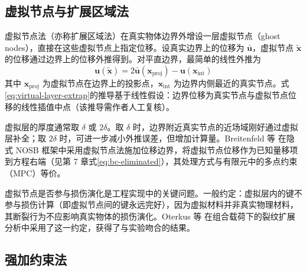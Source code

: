 \subsection{虚拟节点与扩展区域法}

虚拟节点法（亦称扩展区域法）在真实物体边界外增设一层虚拟节点（ghost nodes），直接在这些虚拟节点上指定位移。设真实边界上的位移为 $\bar{\mathbf{u}}$，虚拟节点 $\tilde{\mathbf{x}}$ 的位移通过边界上的位移外推得到。对平直边界，最简单的线性外推为
\begin{equation}
\mathbf{u}(\tilde{\mathbf{x}}) = 2\bar{\mathbf{u}}(\mathbf{x}_{\text{proj}}) - \mathbf{u}(\mathbf{x}_{\text{int}})
\label{eq:virtual-layer-extrap}
\end{equation}
其中 $\mathbf{x}_{\text{proj}}$ 为虚拟节点在边界上的投影点，$\mathbf{x}_{\text{int}}$ 为边界内侧最近的真实节点。式\eqref{eq:virtual-layer-extrap}的推导基于线性假设：边界位移为真实节点与虚拟节点位移的线性插值中点（该推导需作者人工复核）。

虚拟层的厚度通常取 $\delta$ 或 $2\delta$。取 $\delta$ 时，边界附近真实节点的近场域刚好通过虚拟层补全；取 $2\delta$ 时，可进一步减小外推误差，但增加计算量。Breitenfeld 等 \cite{Breitenfeld2014,BreitenfeldThesis2014} 在隐式 NOSB 框架中采用虚拟节点法施加位移边界，将虚拟节点位移作为已知量移项到方程右端（见第 7 章式\eqref{eq:bc-eliminated}），其处理方式与有限元中的多点约束（MPC）等价。

虚拟节点是否参与损伤演化是工程实现中的关键问题。一般约定：虚拟层内的键不参与损伤计算（即虚拟节点间的键永远完好），因为虚拟材料并非真实物理材料，其断裂行为不应影响真实物体的损伤演化。Oterkus 等 \cite{Oterkus2012Combined} 在组合载荷下的裂纹扩展分析中采用了这一约定，获得了与实验吻合的结果。

\subsection{强加约束法}

